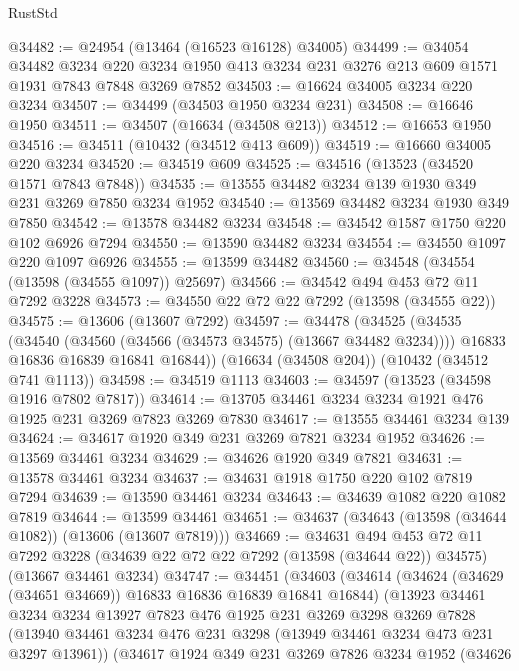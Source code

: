 \begin{lexlean}{RustStd}
\begin{coremodule}
@34482 := @24954 (@13464 (@16523 @16128) @34005)
@34499 := @34054
    @34482
    @3234
    @220
    @3234
    @1950
    @413
    @3234
    @231
    @3276
    @213
    @609
    @1571
    @1931
    @7843
    @7848
    @3269
    @7852
@34503 := @16624 @34005 @3234 @220 @3234
@34507 := @34499 (@34503 @1950 @3234 @231)
@34508 := @16646 @1950
@34511 := @34507 (@16634 (@34508 @213))
@34512 := @16653 @1950
@34516 := @34511 (@10432 (@34512 @413 @609))
@34519 := @16660 @34005 @220 @3234
@34520 := @34519 @609
@34525 := @34516 (@13523 (@34520 @1571 @7843 @7848))
@34535 := @13555 @34482 @3234 @139 @1930 @349 @231 @3269 @7850 @3234 @1952
@34540 := @13569 @34482 @3234 @1930 @349 @7850
@34542 := @13578 @34482 @3234
@34548 := @34542 @1587 @1750 @220 @102 @6926 @7294
@34550 := @13590 @34482 @3234
@34554 := @34550 @1097 @220 @1097 @6926
@34555 := @13599 @34482
@34560 := @34548 (@34554 (@13598 (@34555 @1097)) @25697)
@34566 := @34542 @494 @453 @72 @11 @7292 @3228
@34573 := @34550 @22 @72 @22 @7292 (@13598 (@34555 @22))
@34575 := @13606 (@13607 @7292)
@34597 := @34478
    (@34525
      (@34535
        (@34540 (@34560 (@34566 (@34573 @34575) (@13667 @34482 @3234))))
        @16833
        @16836
        @16839
        @16841
        @16844))
    (@16634 (@34508 @204))
    (@10432 (@34512 @741 @1113))
@34598 := @34519 @1113
@34603 := @34597 (@13523 (@34598 @1916 @7802 @7817))
@34614 := @13705 @34461 @3234 @3234 @1921 @476 @1925 @231 @3269 @7823 @3269 @7830
@34617 := @13555 @34461 @3234 @139
@34624 := @34617 @1920 @349 @231 @3269 @7821 @3234 @1952
@34626 := @13569 @34461 @3234
@34629 := @34626 @1920 @349 @7821
@34631 := @13578 @34461 @3234
@34637 := @34631 @1918 @1750 @220 @102 @7819 @7294
@34639 := @13590 @34461 @3234
@34643 := @34639 @1082 @220 @1082 @7819
@34644 := @13599 @34461
@34651 := @34637 (@34643 (@13598 (@34644 @1082)) (@13606 (@13607 @7819)))
@34669 := @34631
    @494
    @453
    @72
    @11
    @7292
    @3228
    (@34639 @22 @72 @22 @7292 (@13598 (@34644 @22)) @34575)
    (@13667 @34461 @3234)
@34747 := @34451
    (@34603
      (@34614
        (@34624 (@34629 (@34651 @34669)) @16833 @16836 @16839 @16841 @16844)
        (@13923
          @34461
          @3234
          @3234
          @13927
          @7823
          @476
          @1925
          @231
          @3269
          @3298
          @3269
          @7828
          (@13940 @34461 @3234 @476 @231 @3298 (@13949 @34461 @3234 @473 @231 @3297 @13961))
          (@34617
            @1924
            @349
            @231
            @3269
            @7826
            @3234
            @1952
            (@34626

\end{coremodule}
\end{lexlean}

